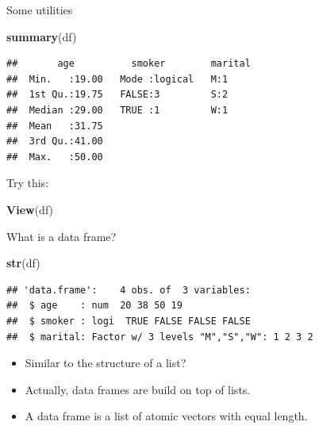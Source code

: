 \documentclass[ignorenonframetext,]{beamer}
\newenvironment{Shaded}{\begin{snugshade}}{\end{snugshade}}
\newcommand{\KeywordTok}[1]{\textcolor[rgb]{0.13,0.29,0.53}{\textbf{#1}}}
\newcommand{\NormalTok}[1]{#1}
\providecommand{\tightlist}{%
  \setlength{\itemsep}{0pt}\setlength{\parskip}{0pt}}
\begin{document}
\begin{frame}[fragile]{Some utilities}
\protect\hypertarget{some-utilities}{}

\begin{Shaded}
\begin{Highlighting}[]
\KeywordTok{summary}\NormalTok{(df)}
\end{Highlighting}
\end{Shaded}

\begin{verbatim}
##       age          smoker        marital
##  Min.   :19.00   Mode :logical   M:1    
##  1st Qu.:19.75   FALSE:3         S:2    
##  Median :29.00   TRUE :1         W:1    
##  Mean   :31.75                          
##  3rd Qu.:41.00                          
##  Max.   :50.00
\end{verbatim}

Try this:

\begin{Shaded}
\begin{Highlighting}[]
\KeywordTok{View}\NormalTok{(df)}
\end{Highlighting}
\end{Shaded}

\end{frame}

\begin{frame}[fragile]{What is a data frame?}
\protect\hypertarget{what-is-a-data-frame-1}{}

\begin{Shaded}
\begin{Highlighting}[]
\KeywordTok{str}\NormalTok{(df)}
\end{Highlighting}
\end{Shaded}

\begin{verbatim}
## 'data.frame':    4 obs. of  3 variables:
##  $ age    : num  20 38 50 19
##  $ smoker : logi  TRUE FALSE FALSE FALSE
##  $ marital: Factor w/ 3 levels "M","S","W": 1 2 3 2
\end{verbatim}

\begin{itemize}
\tightlist
\item
  Similar to the structure of a list?
\item
  Actually, data frames are build on top of lists.
\item
  A data frame is a list of atomic vectors with equal length.
\end{itemize}

\end{frame}
\end{document}
